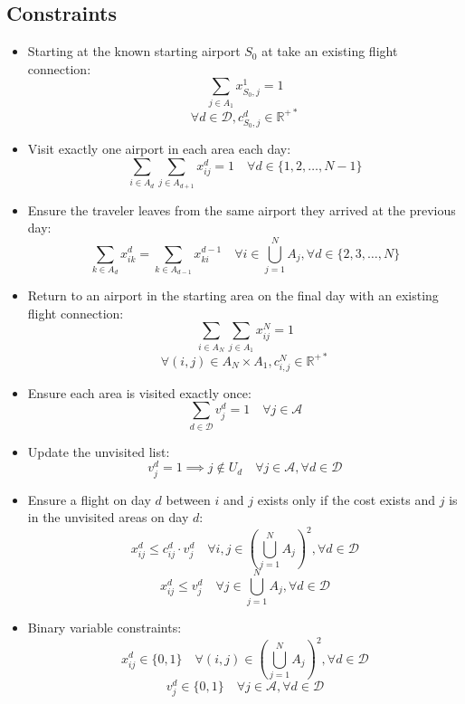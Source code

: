 \subsection*{Constraints}
    \begin{itemize}        
        \item Starting at the known starting airport $S_{0}$ at take an existing flight connection:
        \[ \sum_{j \in A_1} x_{S_{0},j}^1 = 1 \] 
        \[ \forall d \in \mathcal{D}, c_{S_0,j}^{d} \in \mathbb{R^{+*}}\] 
        
        \item Visit exactly one airport in each area each day:
        \[ \sum_{i \in A_{d}} \sum_{j \in A_{d+1}} x_{ij}^d = 1 \quad \forall d \in \{1, 2, \ldots, N-1\} \]

        \item Ensure the traveler leaves from the same airport they arrived at the previous day:
        \[ \sum_{k \in A_d} x_{ik}^d = \sum_{k \in A_{d-1}} x_{ki}^{d-1} \quad \forall i \in \bigcup_{j=1}^N A_j, \forall d \in \{2, 3, \ldots, N\} \]

        \item Return to an airport in the starting area on the final day with an existing flight connection:
        \[ \sum_{i \in A_N} \sum_{j \in A_1} x_{ij}^N = 1 \]
        \[ \forall (i,j) \in A_N \times A_1, c_{i,j}^{N} \in \mathbb{R^{+*}}\] 

        \item Ensure each area is visited exactly once:
        \[ \sum_{d \in \mathcal{D}} v_j^d = 1 \quad \forall j \in \mathcal{A} \]

        \item Update the unvisited list:
        \[ v_j^d = 1 \implies j \notin U_d \quad \forall j \in \mathcal{A}, \forall d \in \mathcal{D} \]

        \item Ensure a flight on day $d$ between $i$ and $j$ exists only if the cost exists and $j$ is in the unvisited areas on day $d$:
        \[ x_{ij}^d \leq c_{ij}^d \cdot v_j^d \quad \forall i, j \in (\bigcup_{j=1}^N A_j)^2, \forall d \in \mathcal{D} \]
        \[ x_{ij}^d \leq v_j^d \quad \forall j \in \bigcup_{j=1}^N A_j, \forall d \in \mathcal{D} \]

        

        \item Binary variable constraints:
        \[x_{ij}^d \in \{0, 1\} \quad \forall (i, j) \in (\bigcup_{j=1}^N A_j)^2, \forall d \in \mathcal{D}\]
        \[ v_j^d \in \{0, 1\} \quad \forall j \in \mathcal{A}, \forall d \in \mathcal{D} \]

    \end{itemize}

